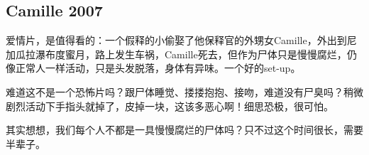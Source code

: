 \subsection{Camille 2007}

爱情片，是值得看的：一个假释的小偷娶了他保释官的外甥女Camille，外出到尼加瓜拉瀑布度蜜月，路上发生车祸，Camille死去，但作为尸体只是慢慢腐烂，仍像正常人一样活动，只是头发脱落，身体有异味。一个好的set-up。

难道这不是一个恐怖片吗？跟尸体睡觉、搂搂抱抱、接吻，难道没有尸臭吗？稍微剧烈活动下手指头就掉了，皮掉一块，这该多恶心啊！细思恐极，很可怕。

其实想想，我们每个人不都是一具慢慢腐烂的尸体吗？只不过这个时间很长，需要半辈子。
